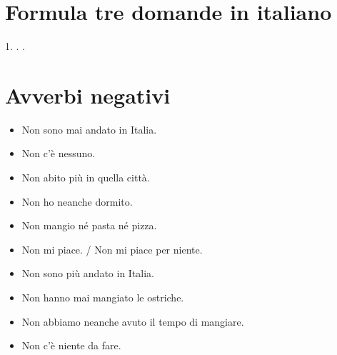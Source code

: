 \documentclass[letter,11pt]{article}
\begin{document}
\section*{Formula tre domande in italiano}
\vskip 0.2in

1. \hrulefill
\vskip 0.2in
. \hrulefill
\vskip 0.2in
. \hrulefill
\vskip 0.5in


\vskip 0.2in

\section*{Avverbi negativi}
\vskip 0.2in

\begin{multicols}{2}
\begin{itemize}

    \item Non sono mai andato in Italia.
    \item Non c'è nessuno.
    \item Non abito più in quella città.
    \item Non ho neanche dormito.
    \item Non mangio né pasta né pizza.
    \item Non mi piace. / Non mi piace per niente.
    \item Non sono più andato in Italia.
    \item Non hanno mai mangiato le ostriche.
    \item Non abbiamo neanche avuto il tempo di mangiare.
    \item Non c'è niente da fare.

\end{itemize}
\end{multicols}
\end{document}
